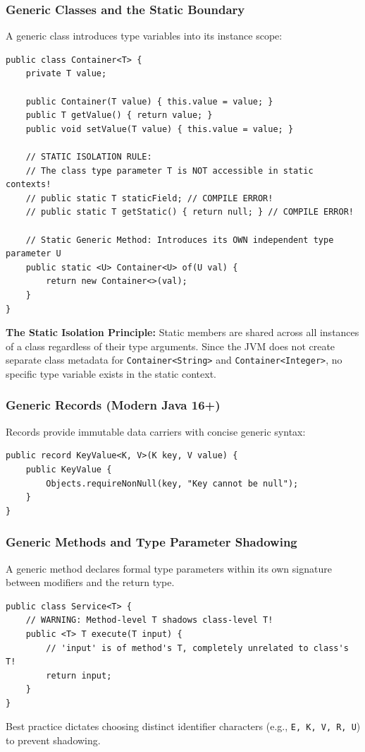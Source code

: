 \documentclass[10pt,journal,compsoc,onecolumn]{IEEEtran}
\begin{document}
\subsubsection{Generic Classes and the Static Boundary}
A generic class introduces type variables into its instance scope:
\begin{lstlisting}[caption={Generic Container Class and the Static Isolation Boundary}]
public class Container<T> {
    private T value;

    public Container(T value) { this.value = value; }
    public T getValue() { return value; }
    public void setValue(T value) { this.value = value; }

    // STATIC ISOLATION RULE:
    // The class type parameter T is NOT accessible in static contexts!
    // public static T staticField; // COMPILE ERROR!
    // public static T getStatic() { return null; } // COMPILE ERROR!

    // Static Generic Method: Introduces its OWN independent type parameter U
    public static <U> Container<U> of(U val) {
        return new Container<>(val);
    }
}
\end{lstlisting}
\textbf{The Static Isolation Principle:} Static members are shared across all instances of a class regardless of their type arguments. Since the JVM does not create separate class metadata for \texttt{Container<String>} and \texttt{Container<Integer>}, no specific type variable exists in the static context.

\subsubsection{Generic Records (Modern Java 16+)}
Records provide immutable data carriers with concise generic syntax:
\begin{lstlisting}[caption={Generic Record Declaration}]
public record KeyValue<K, V>(K key, V value) {
    public KeyValue {
        Objects.requireNonNull(key, "Key cannot be null");
    }
}
\end{lstlisting}

\subsubsection{Generic Methods and Type Parameter Shadowing}
A generic method declares formal type parameters within its own signature between modifiers and the return type.
\begin{lstlisting}[caption={Method Type Parameter Shadowing Trap}]
public class Service<T> {
    // WARNING: Method-level T shadows class-level T!
    public <T> T execute(T input) {
        // 'input' is of method's T, completely unrelated to class's T!
        return input;
    }
}
\end{lstlisting}
Best practice dictates choosing distinct identifier characters (e.g., \texttt{E, K, V, R, U}) to prevent shadowing.
\end{document}
